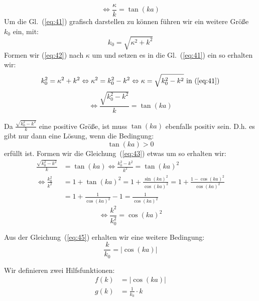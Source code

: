 \begin{equation}
  \label{eq:41}
  \Leftrightarrow \frac \kappa k = \tan(ka)
\end{equation}
Um die Gl.~(\ref{eq:41}) grafisch darstellen zu können führen wir ein weitere
Größe $k_0$ ein, mit:
\begin{equation}
  \label{eq:42}
  k_0=\sqrt{\kappa^2+k^2}
\end{equation}
Formen wir (\ref{eq:42}) nach $\kappa$ um und setzen es in die Gl.~(\ref{eq:41})
ein so erhalten wir:
\begin{equation*}
   k_0^2=\kappa^2+k^2 \Leftrightarrow  \kappa^2=k_0^2-k^2
                      \Leftrightarrow  \kappa=\sqrt{k_0^2-k^2} \text{  in  }
                                        (\ref{eq:41}) 
\end{equation*}
\begin{equation}
  \label{eq:43}
  \Leftrightarrow \frac {\sqrt{k_0^2-k^2}} k = \tan(ka)
\end{equation}

Da $\frac {\sqrt{k_0^2-k^2}} k$ eine positive Größe, ist muss $\tan(ka)$
ebenfalls positiv sein. D.h. es gibt nur dann eine Lösung, wenn die Bedingung:
\begin{equation}
  \label{eq:44}
  \tan(ka) > 0
\end{equation}
erfüllt ist.
Formen wir die Gleichung~(\ref{eq:43}) etwas um so erhalten wir:
\begin{align*}
  \frac {\sqrt{k_0^2-k^2}} k &= \tan(ka)
   \Leftrightarrow \frac {k_0^2-k^2} {k^2} = \tan(ka)^2\\
   \Leftrightarrow \frac {k_0^2} {k^2} &=1+\tan(ka)^2
    =1+\frac {\sin(ka)^2} {\cos(ka)^2}
    =1+\frac {1-\cos(ka)^2} {\cos(ka)^2}\\
    &=1+\frac 1 {\cos(ka)^2} - 1 = \frac 1 {\cos(ka)^2}
\end{align*}
\begin{equation}
  \label{eq:45}
   \Leftrightarrow \frac {k^2} {k_0^2} = \cos(ka)^2
\end{equation}

Aus der Gleichung~(\ref{eq:45}) erhalten wir eine weitere Bedingung:
\begin{equation}
  \label{eq:46}
   \frac {k} {k_0} = |\cos(ka)|
\end{equation}

Wir definieren zwei Hilfsfunktionen:
\begin{align*}
  f(k) &= |\cos(ka)|\\
  g(k) &= \frac 1 {k_0} \cdot k
\end{align*}

